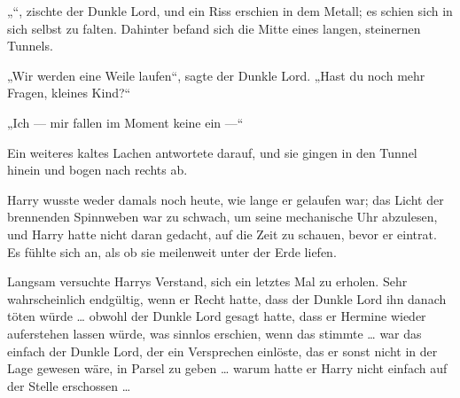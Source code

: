 „“, zischte der Dunkle Lord, und ein Riss erschien in dem Metall; es schien sich in sich selbst zu falten. Dahinter befand sich die Mitte eines langen, steinernen Tunnels.


„Wir werden eine Weile laufen“, sagte der Dunkle Lord.
„Hast du noch mehr Fragen, kleines Kind?“

„Ich — mir fallen im Moment keine ein —“

Ein weiteres kaltes Lachen antwortete darauf, und sie gingen in den Tunnel hinein und bogen nach rechts ab.

Harry wusste weder damals noch heute, wie lange er gelaufen war; das Licht der brennenden Spinnweben war zu schwach, um seine mechanische Uhr abzulesen, und Harry hatte nicht daran gedacht, auf die Zeit zu schauen, bevor er eintrat. Es fühlte sich an, als ob sie meilenweit unter der Erde liefen.

Langsam versuchte Harrys Verstand, sich ein letztes Mal zu erholen. Sehr wahrscheinlich endgültig, wenn er Recht hatte, dass der Dunkle Lord ihn danach töten würde … obwohl der Dunkle Lord gesagt hatte, dass er Hermine wieder auferstehen lassen würde, was sinnlos erschien, wenn das stimmte … war das einfach der Dunkle Lord, der ein Versprechen einlöste, das er sonst nicht in der Lage gewesen wäre, in Parsel zu geben … warum hatte er Harry nicht einfach auf der Stelle erschossen …

